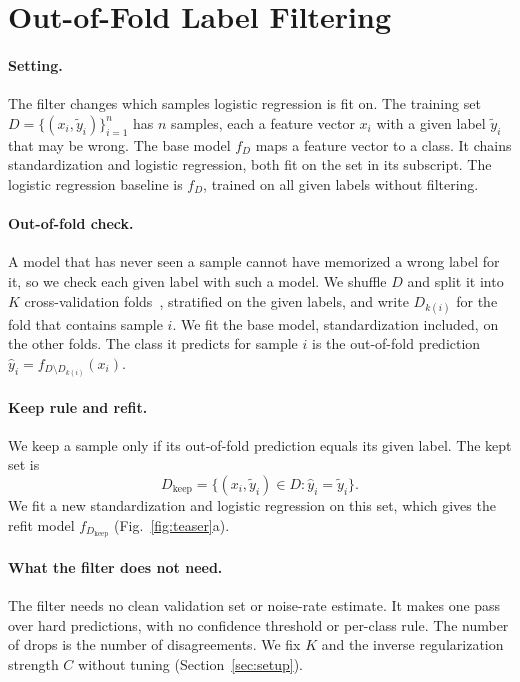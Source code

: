 \section{Out-of-Fold Label Filtering}\label{sec:method}

\paragraph{Setting.}
The filter changes which samples logistic regression is fit on. The training set $D=\{(x_i,\tilde{y}_i)\}_{i=1}^{n}$ has $n$ samples, each a feature vector $x_i$ with a given label $\tilde{y}_i$ that may be wrong. The base model $f_D$ maps a feature vector to a class. It chains standardization and logistic regression, both fit on the set in its subscript. The logistic regression baseline is $f_D$, trained on all given labels without filtering.

\paragraph{Out-of-fold check.}
A model that has never seen a sample cannot have memorized a wrong label for it, so we check each given label with such a model. We shuffle $D$ and split it into $K$ cross-validation folds~\citep{stone1974crossvalidatory}, stratified on the given labels, and write $D_{k(i)}$ for the fold that contains sample $i$. We fit the base model, standardization included, on the other folds. The class it predicts for sample $i$ is the out-of-fold prediction $\hat{y}_i = f_{D \setminus D_{k(i)}}(x_i)$.

\paragraph{Keep rule and refit.}
We keep a sample only if its out-of-fold prediction equals its given label. The kept set is
\begin{equation}
  D_{\mathrm{keep}} = \{(x_i,\tilde{y}_i) \in D : \hat{y}_i = \tilde{y}_i\}.
  \label{eq:keep}
\end{equation}
We fit a new standardization and logistic regression on this set, which gives the refit model $f_{D_{\mathrm{keep}}}$ (Fig.~\ref{fig:teaser}a).

\paragraph{What the filter does not need.}
The filter needs no clean validation set or noise-rate estimate. It makes one pass over hard predictions, with no confidence threshold or per-class rule. The number of drops is the number of disagreements. We fix $K$ and the inverse regularization strength $C$ without tuning (Section~\ref{sec:setup}).
